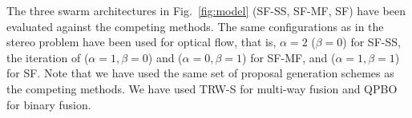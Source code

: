\noindent
The three swarm architectures in Fig.~\ref{fig:model} (SF-SS, SF-MF, SF)
have been evaluated against the competing methods. The same
configurations as in the stereo problem have been used for optical flow,
that is, $\alpha=2$ ($\beta=0$) for SF-SS, the iteration of
($\alpha=1, \beta=0$) and ($\alpha=0, \beta=1$) for SF-MF, and
($\alpha=1, \beta=1$) for SF.
%
Note that we have used the same set of proposal generation schemes as
the competing methods. We have used TRW-S for multi-way fusion and QPBO
for binary fusion.
%
